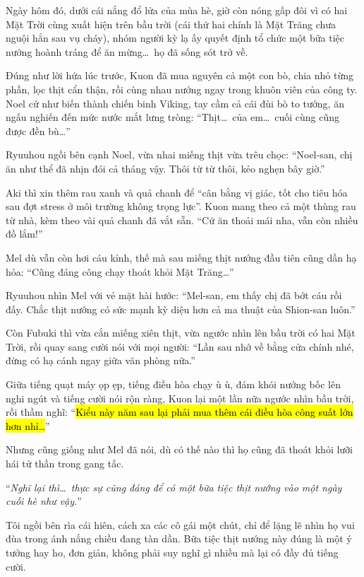 \documentclass[../main.tex]{subfiles}
\begin{document}
Ngày hôm đó, dưới cái nắng đổ lửa của mùa hè, giờ còn nóng gấp đôi vì có hai Mặt Trời cùng xuất hiện trên bầu trời (cái thứ hai chính là Mặt Trăng chưa nguội hẳn sau vụ cháy), nhóm người kỳ lạ ấy quyết định tổ chức một bữa tiệc nướng hoành tráng để ăn mừng\dots\ họ đã sống sót trở về.

Đúng như lời hứa lúc trước, Kuon đã mua nguyên cả một con bò, chia nhỏ từng phần, lọc thịt cẩn thận, rồi cùng nhau nướng ngay trong khuôn viên của công ty. Noel cứ như biến thành chiến binh Viking, tay cầm cả cái đùi bò to tướng, ăn ngấu nghiến đến mức nước mắt lưng tròng: ``Thịt\dots\ của em\dots\ cuối cùng cũng được đền bù\dots''

Ryuuhou ngồi bên cạnh Noel, vừa nhai miếng thịt vừa trêu chọc: ``Noel-san, chị ăn như thể đã nhịn đói cả tháng vậy. Thôi từ từ thôi, kẻo nghẹn bây giờ.''

Aki thì xin thêm rau xanh và quả chanh để ``cân bằng vị giác, tốt cho tiêu hóa sau đợt stress ở môi trường không trọng lực''. Kuon mang theo cả một thùng rau từ nhà, kèm theo vài quả chanh đã vắt sẵn. ``Cứ ăn thoải mái nha, vẫn còn nhiều đồ lắm!''

Mel dù vẫn còn hơi cáu kỉnh, thế mà sau miếng thịt nướng đầu tiên cũng dần hạ hỏa: ``Cũng đáng công chạy thoát khỏi Mặt Trăng\dots''

Ryuuhou nhìn Mel với vẻ mặt hài hước: ``Mel-san, em thấy chị đã bớt cáu rồi đấy. Chắc thịt nướng có sức mạnh kỳ diệu hơn cả ma thuật của Shion-san luôn.''

Còn Fubuki thì vừa cắn miếng xiên thịt, vừa ngước nhìn lên bầu trời có hai Mặt Trời, rồi quay sang cười nói với mọi người: ``Lần sau nhớ về bằng cửa chính nhé, đừng có hạ cánh ngay giữa văn phòng nữa.''

Giữa tiếng quạt máy ọp ẹp, tiếng điều hòa chạy ù ù, đám khói nướng bốc lên nghi ngút và tiếng cười nói rộn ràng, Kuon lại một lần nữa ngước nhìn bầu trời, rồi thầm nghĩ: ``\hl{Kiểu này năm sau lại phải mua thêm cái điều hòa công suất lớn hơn nhỉ\dots}''

Nhưng cũng giống như Mel đã nói, dù có thế nào thì họ cũng đã thoát khỏi lưỡi hái tử thần trong gang tấc.

``\textit{Nghĩ lại thì\dots\ thực sự cũng đáng để có một bữa tiệc thịt nướng vào một ngày cuối hè như vậy.}''

\il


Tôi ngồi bên rìa cái hiên, cách xa các cô gái một chút, chỉ để lặng lẽ nhìn họ vui đùa trong ánh nắng chiều đang tàn dần. Bữa tiệc thịt nướng này đúng là một ý tưởng hay ho, đơn giản, không phải suy nghĩ gì nhiều mà lại có đầy đủ tiếng cười.
\end{document}
